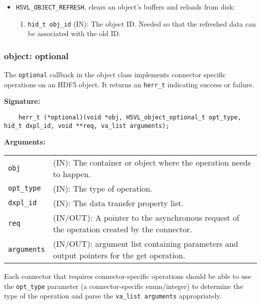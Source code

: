 \begin{itemize}
\item \texttt{H5VL\_OBJECT\_REFRESH}, clears an object's buffers and reloads from disk:
  \begin{enumerate}
  \item \texttt{hid\_t obj\_id} (IN): The object ID. Needed so that the refreshed data can be associated with the old ID. 
  \end{enumerate}
\end{itemize}

\subsubsection{object: optional}
The \texttt{optional} callback in the object class implements connector specific operations on an HDF5 object. It returns an \texttt{herr\_t} indicating success or failure. \bigskip

\begin{mdframed}[style=bgbox]
\textbf{Signature:}
\begin{lstlisting}
    herr_t (*optional)(void *obj, H5VL_object_optional_t opt_type, hid_t dxpl_id, void **req, va_list arguments);
\end{lstlisting}

\textbf{Arguments:}\\
\begin{tabular}{l p{13.5cm}}
  \texttt{obj} & (IN): The container or object where the operation needs to happen.\\
  \texttt{opt\_type} & (IN): The type of operation.\\
  \texttt{dxpl\_id} & (IN): The data transfer property list.\\
  \texttt{req} & (IN/OUT): A pointer to the asynchronous request of the operation created by the connector.\\
  \texttt{arguments} & (IN/OUT): argument list containing parameters and output pointers for the get operation. \\
\end{tabular}
\end{mdframed}

Each connector that requires connector-specific operations should be able to use the \texttt{opt\_type} parameter (a connector-specific enum/integer) to determine the type of the operation and parse the \texttt{va\_list arguments} appropriately.



